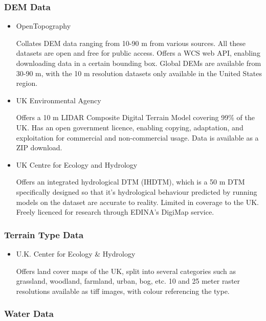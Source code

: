 \documentclass[12pt]{article}
\begin{document}
\subsubsection{DEM Data}

\begin{itemize}
  \item OpenTopography \autocite{esa2024dem}

        Collates DEM data ranging from 10-90 m from various sources. All these datasets are open and free for public access. Offers a WCS web API, enabling downloading data in a certain bounding box. Global DEMs are available from 30-90 m, with the 10 m resolution datasets only available in the United States region.

  \item UK Environmental Agency \autocite{ukgov_env}

        Offers a 10 m LIDAR Composite Digital Terrain Model covering 99\% of the UK. Has an open government licence, enabling copying, adaptation, and exploitation for commercial and non-commercial usage. Data is available as a ZIP download.

  \item UK Centre for Ecology and Hydrology \autocite{ceh}

        Offers an integrated hydrological DTM (IHDTM), which is a 50 m DTM specifically designed so that it's hydrological behaviour predicted by running models on the dataset are accurate to reality. Limited in coverage to the UK. Freely licenced for research through EDINA's DigiMap service.

\end{itemize}

\subsubsection{Terrain Type Data}

\begin{itemize}
  \item U.K. Center for Ecology \& Hydrology \autocite{ceh}

        Offers land cover maps of the UK, split into several categories such as grassland, woodland, farmland, urban, bog, etc. 10 and 25 meter raster resolutions available as tiff images, with colour referencing the type.

\end{itemize}

\subsubsection{Water Data}
\end{document}
